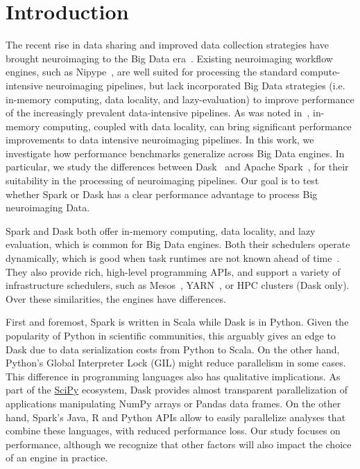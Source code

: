 \documentclass[conference]{IEEEtran}
\begin{document}
\section{Introduction}
The recent rise in data sharing and improved data collection strategies have brought
neuroimaging to the Big Data era~\cite{ALFAROALMAGRO:18, van2014human}. Existing
neuroimaging workflow engines, such as Nipype~\cite{Nipype:11}, are well suited for
processing the standard compute-intensive neuroimaging pipelines, but lack
incorporated Big Data strategies (i.e. in-memory computing, data locality, and
lazy-evaluation) to improve performance of the increasingly prevalent data-intensive
pipelines. As was noted in~\cite{hayot2019performance}, in-memory computing, coupled
with data locality, can bring significant performance improvements to data intensive
neuroimaging pipelines. In this work, we investigate how performance benchmarks
generalize across Big Data engines. In particular, we study the differences between
Dask~\cite{Dask:15} and Apache Spark~\cite{Spark:16}, for their suitability in the
processing of neuroimaging pipelines. Our goal is to test whether Spark or Dask has a
clear performance advantage to process Big neuroimaging Data. 

Spark and Dask both offer in-memory computing, data locality, and lazy evaluation,
which is common for Big Data engines. Both their schedulers operate dynamically,
which is good when task runtimes are not known ahead of time~\cite{Dask:15}. They
also provide rich, high-level programming APIs, and support a variety of
infrastructure schedulers, such as Mesos~\cite{hindman2011mesos}, YARN~\cite{vavilapalli2013apache}, or HPC clusters (Dask only). Over
these similarities, the engines have differences.

First and foremost, Spark is written in Scala while Dask is in Python.
Given the popularity of Python in scientific communities, this arguably
gives an edge to Dask due to data serialization costs from Python to Scala.
On the other hand, Python's Global Interpreter Lock (GIL) might reduce
parallelism in some cases. This difference in programming languages also
has qualitative implications. As part of the \href{http://scipy.org}{SciPy}
ecosystem, Dask provides almost transparent parallelization of applications
manipulating NumPy arrays or Pandas data frames. On the other hand, Spark's
Java, R and Python APIs allow to easily parallelize analyses that combine
these languages, with reduced performance loss. Our study focuses on
performance, although we recognize that other factors will also impact the
choice of an engine in practice.
\end{document}
